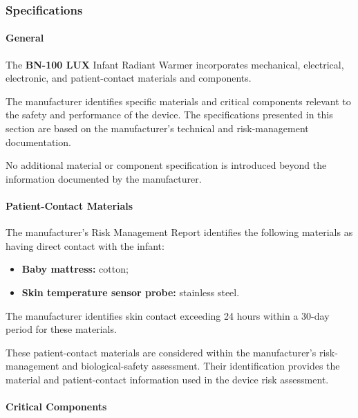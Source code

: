 ﻿

\hypertarget{p3-2-3-1}{}

\subsubsection{Specifications}

\paragraph{General}

The \textbf{BN-100 LUX} Infant Radiant Warmer incorporates
mechanical, electrical, electronic, and patient-contact materials
and components.

The manufacturer identifies specific materials and critical
components relevant to the safety and performance of the device.
The specifications presented in this section are based on the
manufacturer's technical and risk-management documentation.

No additional material or component specification is introduced
beyond the information documented by the manufacturer.

\paragraph{Patient-Contact Materials}

The manufacturer's Risk Management Report identifies the following
materials as having direct contact with the infant:

\begin{itemize}
    \item \textbf{Baby mattress:} cotton;
    \item \textbf{Skin temperature sensor probe:} stainless steel.
\end{itemize}

The manufacturer identifies skin contact exceeding 24 hours within
a 30-day period for these materials.

These patient-contact materials are considered within the
manufacturer's risk-management and biological-safety assessment.
Their identification provides the material and patient-contact
information used in the device risk assessment.

\paragraph{Critical Components}

